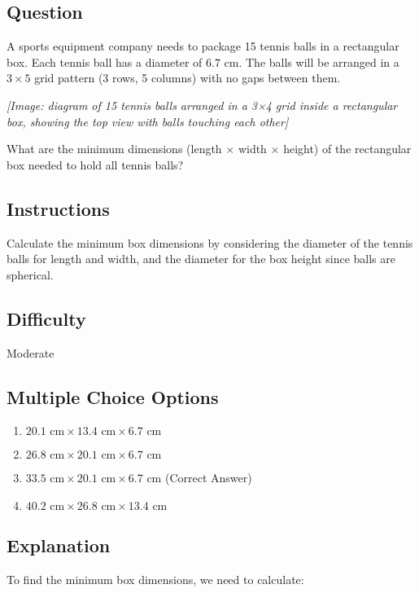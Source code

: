 \documentclass[12pt]{article}
\begin{document}
\subsection*{Question}
A sports equipment company needs to package 15 tennis balls in a rectangular box. Each tennis ball has a diameter of $6.7 \text{ cm}$. The balls will be arranged in a $3 \times 5$ grid pattern (3 rows, 5 columns) with no gaps between them.

\begin{center}
\textit{[Image: diagram of 15 tennis balls arranged in a 3×4 grid inside a rectangular box, showing the top view with balls touching each other]}
\end{center}

What are the minimum dimensions (length $\times$ width $\times$ height) of the rectangular box needed to hold all tennis balls?

\subsection*{Instructions}
Calculate the minimum box dimensions by considering the diameter of the tennis balls for length and width, and the diameter for the box height since balls are spherical.

\subsection*{Difficulty}
Moderate

\subsection*{Multiple Choice Options}
\begin{enumerate}[label=(\Alph*)]
\item $20.1 \text{ cm} \times 13.4 \text{ cm} \times 6.7 \text{ cm}$
\item $26.8 \text{ cm} \times 20.1 \text{ cm} \times 6.7 \text{ cm}$
\item \textbf{$33.5 \text{ cm} \times 20.1 \text{ cm} \times 6.7 \text{ cm}$} \quad (Correct Answer)
\item $40.2 \text{ cm} \times 26.8 \text{ cm} \times 13.4 \text{ cm}$
\end{enumerate}

\subsection*{Explanation}
To find the minimum box dimensions, we need to calculate:
\end{document}
